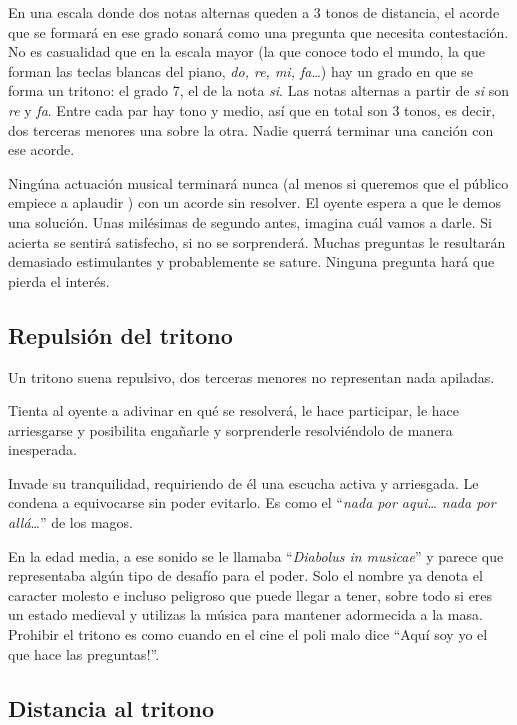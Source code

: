\documentclass[]{article}
\begin{document}
En una escala donde dos notas alternas queden a 3 tonos de distancia, el acorde que se formará en ese grado sonará como una pregunta que necesita contestación. No es casualidad que en la escala mayor (la que conoce todo el mundo, la que forman las teclas blancas del piano, \emph{do, re,   mi, fa}\ldots) hay un grado en que se forma un tritono: el grado 7, el de la nota \emph{si}. Las notas alternas a partir de \emph{si} son \emph{re} y \emph{fa}. Entre cada par hay tono y medio, así que en total son 3 tonos, es decir, dos terceras menores una sobre la otra. Nadie querrá terminar una canción con ese acorde.

Ningúna actuación musical terminará nunca (al menos si queremos que el público empiece a aplaudir ) con un acorde sin resolver. El oyente espera a que le demos una solución. Unas milésimas de segundo antes, imagina cuál vamos a darle. Si acierta se sentirá satisfecho, si no se sorprenderá. Muchas preguntas le resultarán demasiado estimulantes y probablemente se sature. Ninguna pregunta hará que pierda el interés.

\subsection{Repulsión del tritono}

Un tritono suena repulsivo, dos terceras menores no representan nada apiladas.

Tienta al oyente a adivinar en qué se resolverá, le hace participar, le hace arriesgarse y posibilita engañarle y sorprenderle resolviéndolo de manera inesperada.

Invade su tranquilidad, requiriendo de él una escucha activa y arriesgada. Le condena a equivocarse sin poder evitarlo. Es como el ``\emph{nada por aqui\ldots{}   nada por allá}\ldots{}'' de los magos.

En la edad media, a ese sonido se le llamaba ``\emph{Diabolus in musicae}'' y parece que representaba algún tipo de desafío para el poder. Solo el nombre ya denota el caracter molesto e incluso peligroso que puede llegar a tener, sobre todo si eres un estado medieval y utilizas la música para mantener adormecida a la masa. Prohibir el tritono es como cuando en el cine el poli malo dice ``Aquí soy yo el que hace las preguntas!''.

\subsection{Distancia al tritono}
\end{document}
